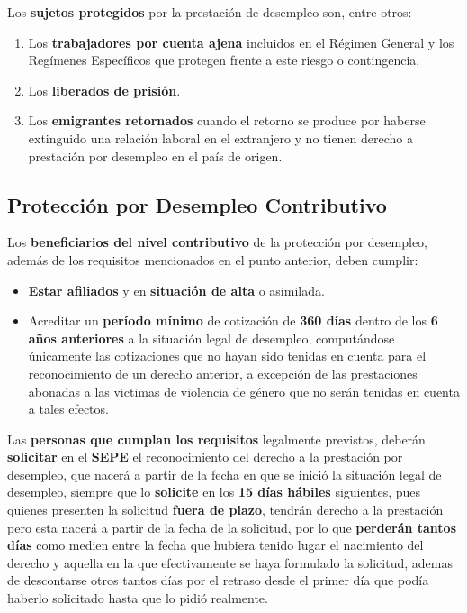 Los \textbf{sujetos protegidos} por la prestación de desempleo son, entre otros:
\begin{enumerate}
    \item Los \textbf{trabajadores por cuenta ajena} incluidos en el Régimen General y los Regímenes Específicos que protegen frente a este riesgo o contingencia.
    \item Los \textbf{liberados de prisión}.
    \item Los \textbf{emigrantes retornados} cuando el retorno se produce por haberse extinguido una relación laboral en el extranjero y no tienen derecho a prestación por desempleo en el país de origen.
\end{enumerate}

\subsection{Protección por Desempleo Contributivo}
Los \textbf{beneficiarios del nivel contributivo} de la protección por desempleo, además de los requisitos mencionados en el punto anterior, deben cumplir:

\begin{itemize}
    \item \textbf{Estar afiliados}  y en \textbf{situación de alta} o asimilada.
    \item Acreditar un \textbf{período mínimo} de cotización de \textbf{360 días} dentro de los \textbf{6 años anteriores} a la situación legal de desempleo, computándose únicamente las cotizaciones que no hayan sido tenidas en cuenta para el reconocimiento de un derecho anterior, a excepción de las prestaciones abonadas a las victimas de violencia de género que no serán tenidas en cuenta a tales efectos.
\end{itemize}

Las \textbf{personas que cumplan los requisitos} legalmente previstos, deberán \textbf{solicitar} en el \textbf{SEPE} el reconocimiento del derecho a la prestación por desempleo, que nacerá a partir de la fecha en que se inició la situación legal de desempleo, siempre que lo \textbf{solicite} en los \textbf{15 días hábiles} siguientes, pues quienes presenten la solicitud \textbf{fuera de plazo}, tendrán derecho a la prestación pero esta nacerá a partir de la fecha de la solicitud, por lo que \textbf{perderán tantos días} como medien entre la fecha que hubiera tenido lugar el nacimiento del derecho y aquella en la que efectivamente se haya formulado la solicitud, ademas de descontarse otros tantos días por el retraso desde el primer día que podía haberlo solicitado hasta que lo pidió realmente.

